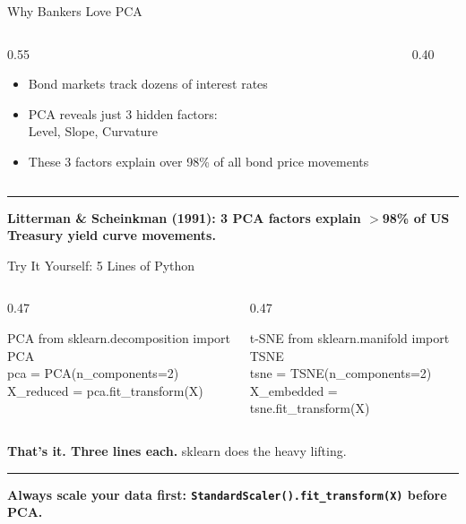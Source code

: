 \documentclass[8pt,aspectratio=169]{beamer}
\newcommand{\bottomnote}[1]{%
\vfill
\vspace{-2mm}
\textcolor{mllavender2}{\rule{\textwidth}{0.4pt}}
\vspace{1mm}
\footnotesize
\textbf{#1}
}
\newenvironment{compactlist}{%
  \begin{itemize}%
    \setlength{\itemsep}{2pt}%
    \setlength{\parskip}{0pt}%
    \setlength{\parsep}{0pt}%
}{%
  \end{itemize}%
}
\newcommand{\highlight}[1]{\textcolor{mlorange}{\textbf{#1}}}
\begin{document}
\begin{frame}{Why Bankers Love PCA}
\begin{columns}[T]
\begin{column}{0.55\textwidth}
\begin{compactlist}
  \item Bond markets track dozens of interest rates
  \item PCA reveals just 3 hidden factors:\\Level, Slope, Curvature
  \item These 3 factors explain over 98\% of all bond price movements
\end{compactlist}
\end{column}
\begin{column}{0.40\textwidth}
\centering
\vspace{2mm}
\end{column}
\end{columns}
\bottomnote{Litterman \& Scheinkman (1991): 3 PCA factors explain $>$98\% of US Treasury yield curve movements.}
\end{frame}

\begin{frame}{Try It Yourself: 5 Lines of Python}
\begin{columns}[T]
\begin{column}{0.47\textwidth}
\begin{block}{PCA}
\ttfamily\scriptsize
from sklearn.decomposition import PCA\\
pca = PCA(n\_components=2)\\
X\_reduced = pca.fit\_transform(X)
\end{block}
\end{column}
\begin{column}{0.47\textwidth}
\begin{block}{t-SNE}
\ttfamily\scriptsize
from sklearn.manifold import TSNE\\
tsne = TSNE(n\_components=2)\\
X\_embedded = tsne.fit\_transform(X)
\end{block}
\end{column}
\end{columns}

\vspace{5mm}
\centering
\highlight{That's it. Three lines each.} sklearn does the heavy lifting.

\bottomnote{Always scale your data first: \texttt{StandardScaler().fit\_transform(X)} before PCA.}
\end{frame}
\end{document}
